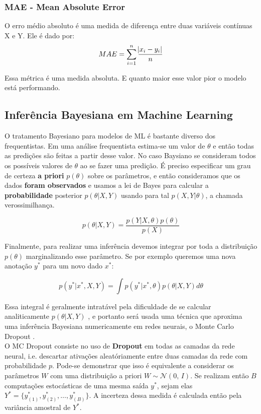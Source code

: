 \subsubsection{MAE - Mean Absolute Error}

O erro médio absoluto é uma medida de diferença entre duas variáveis contínuas
X e Y. Ele é dado por: \\

\[MAE = \sum^n_{i=1}\frac{\abs{x_i - y_i}}{n}\]

Essa métrica é uma medida absoluta. E quanto maior esse valor pior o modelo está performando.


\subsection{Inferência Bayesiana em Machine Learning}

O tratamento Bayesiano para modelos de ML é bastante diverso dos frequentistas.
Em uma análise frequentista estima-se um valor de $\theta$ e então todas as
predições são feitas a partir desse valor. No caso Baysiano se consideram todos
os possíveis valores de $\theta$ ao se fazer uma predição. É preciso especificar
um grau de certeza \textbf{a priori} $p(\theta)$ sobre os parâmetros, e então consideramos que os dados \textbf{foram observados} e usamos a lei de Bayes para calcular a \textbf{probabilidade} posterior $p(\theta | X,Y)$ usando para tal $p(X,Y | \theta)$, a chamada verossimilhança. 

\[    p(\theta | X,Y) = \frac{p(Y| X,\theta) p(\theta)}{p(X)}   \]

Finalmente, para realizar uma inferência devemos integrar por toda a distribuição $p(\theta)$ marginalizando esse parâmetro. Se por exemplo queremos uma nova anotação $y^*$ para um novo dado $x^*$:

\[ p(y^* | x^* , X,Y) = \int  p(y^* | x^*,\theta) p(\theta | X,Y)  d\theta \]

Essa integral é geralmente intratável pela dificuldade de se calcular
analiticamente $p(\theta | X,Y)$ \citep{ubertime}, e portanto será usada uma
técnica que aproxima uma inferência Bayesiana numericamente em redes neurais, o Monte Carlo
Dropout \citep{dropbayes}. \\

%

O MC Dropout consiste no uso de \textbf{Dropout} em todas as camadas da rede
neural, i.e. descartar ativações aleatóriamente entre duas camadas da rede com
probabilidade $p$. Pode-se demonstrar que isso é equivalente a considerar os
parâmetros $W$ com uma distribuição a priori $W \sim \mathcal{N}(0,\,I)$. Se realizam então $B$ computações estocásticas de uma mesma
saída $y^*$, sejam elas $Y^* = \{y^*_{(1)},y^*_{(2)}, \dots , y^*_{(B)}\}$. A incerteza
  dessa medida é calculada então pela variância amostral de $Y^*$.

